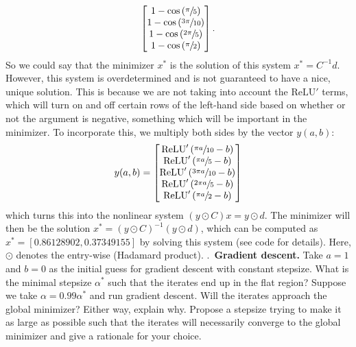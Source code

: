 \documentclass{letter}
\newcounter{problem}
\newcounter{solution}
\newcommand{\Problem}[2]{%
	\stepcounter{problem}%
	\leftskip=0pt%
	\theproblem.~\textbf{{#1.}} #2 \par%
}
\newcommand{\relu}{\mathrm{ReLU}}
\begin{document}
{\begin{align*}
\begin{bmatrix}
            1 - \cos\left(\sfrac{\pi}{5}\right) \\ 
            1 - \cos\left(\sfrac{3\pi}{10}\right) \\ 
            1 - \cos\left(\sfrac{2\pi}{5}\right) \\ 
            1 - \cos\left(\sfrac{\pi}{2}\right) 
        \end{bmatrix}.
    \end{align*} So we could say that the minimizer $x^*$ is the solution of this system $x^* = C^{-1}d$. However, this system is overdetermined and is not guaranteed to have a nice, unique solution. This is because we are not taking into account the $\relu'$ terms, which will turn on and off certain rows of the left-hand side based on whether or not the argument is negative, something which will be important in the minimizer. To incorporate this, we multiply both sides by the vector $y(a,b)$: \begin{align*} 
        y(a, b) = \begin{bmatrix} 
            \relu'\left(\sfrac{\pi a}{10} - b\right) \\
            \relu'\left(\sfrac{\pi a}{5} - b\right) \\
            \relu'\left(\sfrac{3\pi a}{10} - b\right) \\
            \relu'\left(\sfrac{2\pi a}{5} - b\right) \\
            \relu'\left(\sfrac{\pi a}{2} - b\right)
        \end{bmatrix}    
    \end{align*} which turns this into the nonlinear system $(y \odot C)x = y \odot d$. The minimizer will then be the solution $x^* = (y \odot C)^{-1}(y \odot d)$, which can be computed as $x^* = [0.86128902, 0.37349155]$ by solving this system (see code for details). Here, $\odot$ denotes the entry-wise (Hadamard product).}
    \pagebreak
    \Problem{Gradient descent}{Take $a = 1$ and $b = 0$ as the initial guess for gradient descent with constant stepsize. What is the minimal stepsize $\alpha^*$ such that the iterates end up in the flat region? Suppose we take $\alpha = 0.99\alpha^*$ and run gradient descent. Will the iterates approach the global minimizer? Either way, explain why. Propose a stepsize trying to make it as large as possible such that the iterates will necessarily converge to the global minimizer and give a rationale for your choice.}
\end{document}
